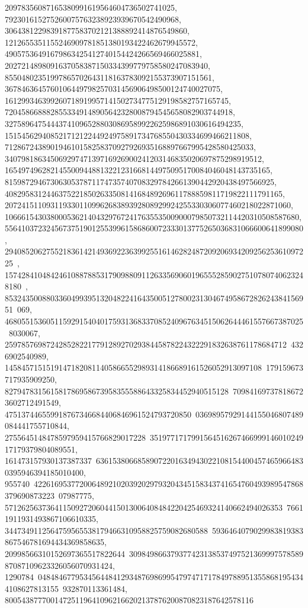 {{{   20978356087165380991619564604736502741025, 
   792301615275260075763238923939670542490968, 
   30643812298391877583702121388892414876549860, 
   1212655351155246909781851380193422462679945572, 
   49057536491679863425412740154424266569466025881, 
   2027214898091637058387150334399779758580247083940, 
   85504802351997865702643118163783092155373907151561, 
   3678463645760106449798257031456906498500124740027075, 
   161299346399260718919957141502734775129198582757165745, 
   7204586688828553349148905642328008794545658082903744918, 
   327589647544437410965288030869589922625986891030616494235, 
   15154562940852171212244924975891734768550430334699466211808, 
   712867243890194610158258370927926935168897667995428580425033, 
   34079818634506929747139716926900241203146835020697875298919512, 
   1654974962821455009448813221231668144975095170084046048143735165, 
   81598729467306305378711747357407083297842661390442920438497566925, 
   4082958312446375221850263350814168489269611788859811719822111791165, 
   207241511093119330110996268389392808929924255330306077460218022871060, 
   10666154303800053621404329767241763553500900079850732114420310508587680, 
   556410372324567375190125539961586860072333013775265036831066600641899080, 
   29408520627552183614214936922363992551614628248720920693420925625361097225\
, 
   1574284104842461088788531790988091126335690601965552859027510780740623248180\
, 
   85324350088033604993951320482241643500512780023130467495867282624384156951\
069, 468055153605115929154040175931368337085240967634515062644461557667387025\
8030067, 25978576987242852822177912892702938445878224322291832638761178684712\
4326902540989, 14584571515191471820811405866552989314186689161526052913097108\
179159673717935909250, 827947831561581786958673958355588643325834452940515128\
709841697378186723602712491549, 475137446559918767346684406846961524793720850\
03698957929144155046807489084441755710844, 2755645148478597959415766829017228\
351977171799156451626746699914601024917179379804089551, 161473157930137387337\
636153806685890722016349430221081544004574659664830395946394185010400, 955740\
42261695377200648921020392029793204345158343741654760493989547868379690873223\
07987775, 5712625637364115092720604415013006408484220425469324140662494026353\
76611911931493867106610335, 3447349112564759565538179466310958825759082680588\
5936464079029983819383867546781694434369858635, 20998566310152697365517822644\
30984986637937742313853749752136999757858987087109623326056070931424, 1290784\
04848467795345644841293487698699547974717178497889513558681954344108627813155\
932870113361484, 800543877700147251196410962166202137876200870823187642578116\
}}}
